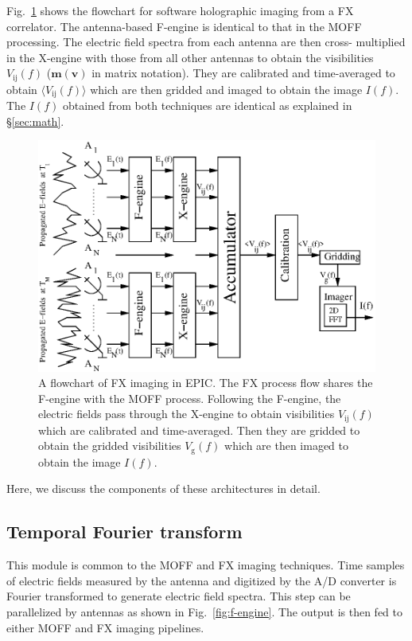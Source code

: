 \documentclass[a4paper,fleqn,usenatbib]{../mnras}
\begin{document}
Fig.~\ref{fig:FX-flowchart} shows the flowchart for software holographic
imaging from a FX correlator. The antenna-based F-engine is identical to that in
the MOFF processing. The electric field spectra from each antenna are then cross-
multiplied in the X-engine with those from all other antennas to obtain the
visibilities $V_\textrm{ij}(f)$ ($\mathbf{m}(\mathbf{v})$ in matrix notation).
They are calibrated and time-averaged to obtain $\langle V_\textrm{ij}(f)\rangle$
which are then gridded and imaged to obtain the image $I(f)$. The $I(f)$ obtained
from both techniques are identical as explained in \S\ref{sec:math}.
\begin{figure}
  \includegraphics[width=\columnwidth]{FX_flowchart.eps}
  \caption{A flowchart of FX imaging in EPIC. The FX process flow shares the
    F-engine with the MOFF process. Following the F-engine, the electric fields
    pass through the X-engine to obtain visibilities $V_\textrm{ij}(f)$ which are
    calibrated and time-averaged. Then they are gridded to obtain the gridded
    visibilities $V_\textrm{g}(f)$ which are then imaged to obtain the image
    $I(f)$.}
  \label{fig:FX-flowchart}
\end{figure}

Here, we discuss the components of these architectures in detail. 

\subsection{Temporal Fourier transform}\label{sec:F-engine}

This module is common to the MOFF and FX imaging techniques. Time samples of
electric fields measured by the antenna and digitized by the A/D converter is
Fourier transformed to generate electric field spectra. This step can be
parallelized by antennas as shown in Fig.~\ref{fig:f-engine}. The output is
then fed to either MOFF and FX imaging pipelines.
\end{document}
